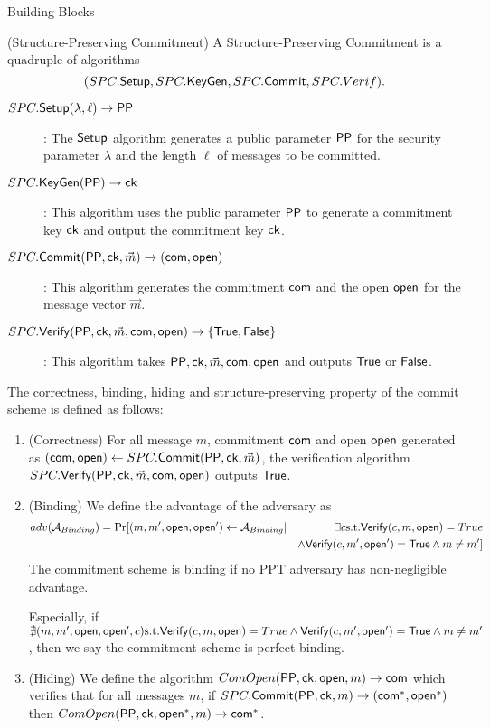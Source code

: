\begin{subsection}{Building Blocks}
  \begin{myDef}{(Structure-Preserving Commitment)}
    A Structure-Preserving Commitment is a quadruple of algorithms
    $$(SPC.{\mathsf{Setup}}, SPC.{\mathsf{KeyGen}}, SPC.{\mathsf{Commit}}, SPC.Verif).$$
    \begin{description}
    \item[$\boldmath{SPC.{\mathsf{Setup}}(\lambda, \ell) \to \mathsf{PP}}$]: The ${\mathsf{Setup}}$ algorithm generates a public parameter $\mathsf{PP}$ for the security parameter $\lambda$ and the length $\ell$ of messages to be committed.
    \item[$\boldmath{SPC.{\mathsf{KeyGen}}(\mathsf{PP}) \to \mathsf{ck}}$]: This algorithm uses the public parameter $\mathsf{PP}$ to generate a commitment key $\mathsf{ck}$ and output the commitment key $\mathsf{ck}$.
    \item[$\boldmath{SPC.{\mathsf{Commit}}(\mathsf{PP}, \mathsf{ck}, \vec{m}) \to (\mathsf{com}, \mathsf{open})}$]: This algorithm generates the commitment $\mathsf{com}$ and the open $\mathsf{open}$ for the message vector $\vec{m}$.
    \item[$\boldmath{SPC.{\mathsf{Verify}}(\mathsf{PP},\mathsf{ck}, \vec{m}, \mathsf{com}, \mathsf{open}) \to \{\mathsf{True}, \mathsf{False}\}}$]:  This algorithm takes $\mathsf{PP}, \mathsf{ck}, \vec{m}, \mathsf{com}, \mathsf{open}$ and outputs $\mathsf{True}$ or $\mathsf{False}$.
    \end{description}

    The correctness, binding, hiding and structure-preserving property of the commit scheme is defined as follows:
    \begin{enumerate}
    \item (Correctness) For all message $m$, commitment $\mathsf{com}$ and open $\mathsf{open}$ generated as $(\mathsf{com}, \mathsf{open}) \gets SPC.{\mathsf{Commit}}(\mathsf{PP}, \mathsf{ck}, \vec{m})$, the verification algorithm $SPC.{\mathsf{Verify}}(\mathsf{PP},\mathsf{ck}, \vec{m}, \mathsf{com}, \mathsf{open})$ outputs $\mathsf{True}$.

    \item(Binding) We define the advantage of the adversary as
      \begin{align*}
        adv(\mathcal{A}_{Binding}) &= \operatorname{Pr}[(m, m', \mathsf{open}, \mathsf{open}') \gets \mathcal{A}_{Binding}| &\exists c \textrm{s.t.} {\mathsf{Verify}}(c,m, \mathsf{open}) = True \\
          &&\wedge {\mathsf{Verify}}(c, m', \mathsf{open}') = \mathsf{True} \wedge m \neq m']
      \end{align*}
      The commitment scheme is binding if no PPT adversary has non-negligible advantage.

      Especially, if $\nexists (m, m', \mathsf{open}, \mathsf{open}', c) \textrm{s.t.} {\mathsf{Verify}}(c,m, \mathsf{open}) = True \wedge {\mathsf{Verify}}(c, m', \mathsf{open}') = \mathsf{True} \wedge m \neq m'$, then we say the commitment scheme is perfect binding.

    \item(Hiding) We define the algorithm $ComOpen(\mathsf{PP}, \mathsf{ck}, \mathsf{open}, m) \to \mathsf{com}$ which verifies that for all messages $m$, if $SPC.{\mathsf{Commit}}(\mathsf{PP}, \mathsf{ck}, m) \to (\mathsf{com}^*, \mathsf{open}^*)$ then $ComOpen(\mathsf{PP}, \mathsf{ck}, \mathsf{open}^*, m) \to \mathsf{com}^*$.


\end{enumerate}
\end{myDef}
\end{subsection}
